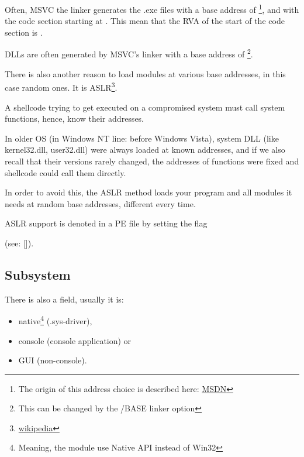 \par Often, \ac{MSVC} the linker generates the .exe files with a base address of 
\footnote{The origin of this address choice is described here: \href{http://go.yurichev.com/17041}{MSDN}},
and with the code section starting at .
This mean that the \ac{RVA} of the start of the code section is .

DLLs are often generated by MSVC's linker with a base address of 
\footnote{This can be changed by the /BASE linker option}.


There is also another reason to load modules at various base addresses, in this case random ones.
It is \ac{ASLR}\footnote{\href{http://go.yurichev.com/17140}{wikipedia}}.


A shellcode trying to get executed on a compromised system must call system functions, hence, know their addresses.

In older \ac{OS} (in \gls{Windows NT} line: before Windows Vista),
system DLL (like kernel32.dll, user32.dll) were always loaded at known addresses, 
and if we also recall
that their versions rarely changed, the addresses of functions were
fixed and shellcode could call them directly.

In order to avoid this, the \ac{ASLR}
method loads your program and all modules it needs at random base addresses, different every time.

\ac{ASLR} support is denoted in a PE file by setting the flag
\par {} (see: [\Russinovich]).

\subsection{Subsystem}

There is also a  field, usually it is:


\begin{itemize}
\item native\footnote{Meaning, the module use Native API instead of Win32} (.sys-driver), 

\item console (console application) or

\item \ac{GUI} (non-console).
\end{itemize}

